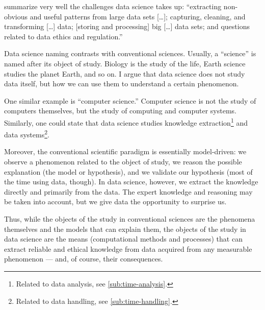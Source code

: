 \textcite{Kelleher2018} summarize very well the challenges data science takes up:
``extracting non-obvious and useful patterns from large data sets [\dots]; capturing,
cleaning, and transforming [\dots] data; [storing and processing] big [\dots] data sets;
and questions related to data ethics and regulation.''

Data science naming contrasts with conventional sciences.  Usually, a ``science'' is named after
its object of study.  Biology is the study of the life, Earth science studies the planet
Earth, and so on.  I argue that data science does not study data itself, but how we can
use them to understand a certain phenomenon.

One similar example is ``computer science.''  Computer science is not the study of
computers themselves, but the study of computing and computer systems.  Similarly, one
could state that data science studies knowledge extraction\footnote{Related to data
analysis, see \cref{sub:time-analysis}.} and data systems\footnote{Related to data
handling, see \cref{sub:time-handling}.}.

Moreover, the conventional scientific paradigm is
essentially model-driven: we observe a phenomenon related to the object of study, we
reason the possible explanation (the model or hypothesis), and we validate our hypothesis
(most of the time using data, though).  In data science, however, we extract the knowledge
directly and primarily from the data.  The expert knowledge and reasoning may be taken
into account, but we give data the opportunity to surprise us.

Thus, while the objects of the study in conventional sciences are the phenomena themselves
and the models that can explain them, the objects of the study in data
science are the means (computational methods and processes) that can extract reliable and ethical
knowledge from data acquired from any measurable phenomenon --- and, of course, their
consequences.

\def\verrids{(0,0) circle (20mm)}
\def\verrist{(-2.5,0) circle (15mm)}
\def\verride {(2.5,0) circle (15mm)}
\def\verrics {(0,-2.5) circle (15mm)}

